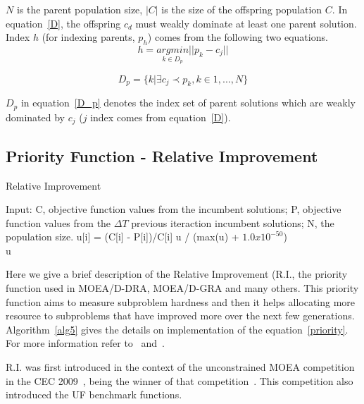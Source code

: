 $N$ is the parent population size, $|C|$ is the size of the offspring population $C$. In equation~\ref{D}, the offspring $c_d$ must weakly dominate at least one parent solution. Index $h$ (for indexing parents, $p_h$) comes from the following two equations.
\begin{equation}
h = \underset{k \in D_p }{argmin} || p_k - c_j ||
\end{equation}

\begin{equation}
\label{D_p}
D_p = \{k| \exists c_j \prec p_k, k \in {1,..., N}\}
\end{equation}

$D_p$ in equation~\ref{D_p} denotes the index set of parent solutions which are weakly dominated by $c_j$ ($j$ index comes from equation~\ref{D}).



\subsection{Priority Function - Relative Improvement}  

\begin{algorithm}[t]
	\caption{Relative Improvement}\label{alg5}
	\begin{algorithmic}[1]
		
		\State Input:  C, objective function values from the incumbent solutions; P, objective function values from the $\Delta T$ previous iteraction incumbent solutions; N, the population size.
		\State u[i] = (C[i] - P[i])/C[i]
		\EndFor
		u / (max(u) + $1.0 x 10^{-50}$)\\
		\Return u
	\end{algorithmic}
\end{algorithm}

Here we give a brief description of the Relative Improvement (R.I., the priority function used in MOEA/D-DRA, MOEA/D-GRA and many others. This priority function aims to measure subproblem hardness and then it helps allocating more resource to subproblems that have  improved more over the next few generations. Algorithm~\ref{alg5} gives the details on implementation of the equation~\ref{priority}.  For more information refer to~\cite{zhang2009performance} and~\cite{zhou2016all}.

R.I. was first introduced in the context of the unconstrained MOEA competition in the CEC 2009~\cite{zhang2009performance}, being the winner of that competition~\cite{zhang2008multiobjective}. This competition also introduced the UF benchmark functions.

